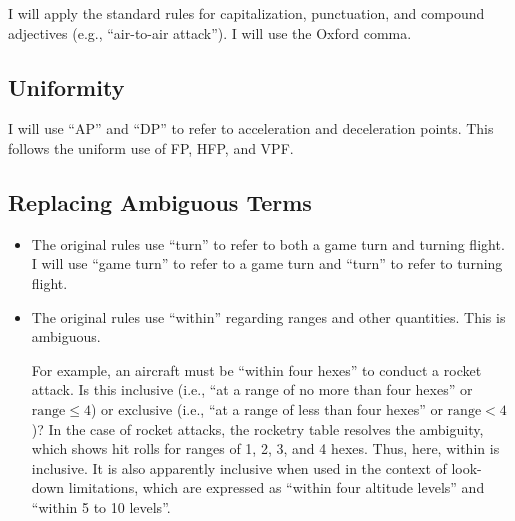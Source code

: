 \documentclass[10pt]{article}
\begin{document}
I will apply the standard rules for capitalization, punctuation, and compound adjectives (e.g., “air-to-air attack”). I will use the Oxford comma.

\subsection{Uniformity}

I will use “AP” and “DP” to refer to acceleration and deceleration points. This follows the uniform use of FP, HFP, and VPF.

\subsection{Replacing Ambiguous Terms}

\begin{itemize}
    \item {} The original rules use “turn” to refer to both a game turn and turning flight. I will use “game turn” to refer to a game turn and “turn” to refer to turning flight.

    \item {} The original rules use “within” regarding ranges and other quantities. This is ambiguous. 
    
    For example, an aircraft must be “within four hexes” to conduct a rocket attack. Is this inclusive (i.e., “at a range of no more than four hexes” or $\textrm{range}\le4$) or exclusive (i.e., “at a range of less than four hexes” or $\textrm{range}<4$)? In the case of rocket attacks, the rocketry table resolves the ambiguity, which shows hit rolls for ranges of 1, 2, 3, and 4 hexes. Thus, here, within is inclusive. It is also apparently inclusive when used in the context of look-down limitations, which are expressed as “within four altitude levels” and “within 5 to 10 levels”.


\end{itemize}
\end{document}
